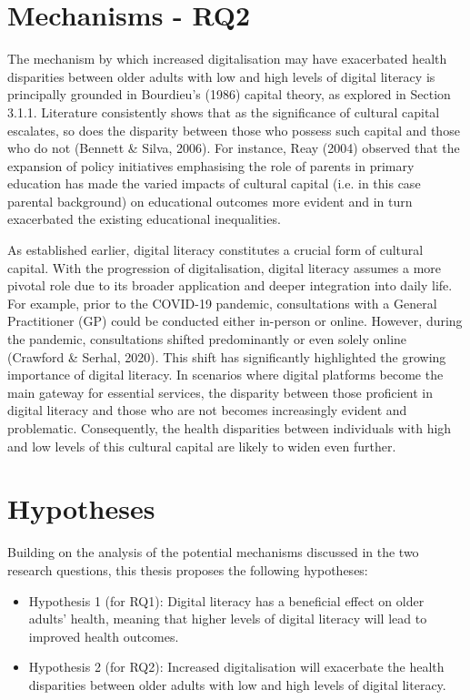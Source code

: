 \section{Mechanisms - RQ2}
The mechanism by which increased digitalisation may have exacerbated health disparities between older adults with low and high levels of digital literacy is principally grounded in Bourdieu's (1986) capital theory, as explored in Section 3.1.1. Literature consistently shows that as the significance of cultural capital escalates, so does the disparity between those who possess such capital and those who do not (Bennett \& Silva, 2006). For instance, Reay (2004) observed that the expansion of policy initiatives emphasising the role of parents in primary education has made the varied impacts of cultural capital (i.e. in this case parental background) on educational outcomes more evident and in turn exacerbated the existing educational inequalities. 

As established earlier, digital literacy constitutes a crucial form of cultural capital. With the progression of digitalisation, digital literacy assumes a more pivotal role due to its broader application and deeper integration into daily life. For example, prior to the COVID-19 pandemic, consultations with a General Practitioner (GP) could be conducted either in-person or online. However, during the pandemic, consultations shifted predominantly or even solely online (Crawford \& Serhal, 2020). This shift has significantly highlighted the growing importance of digital literacy. In scenarios where digital platforms become the main gateway for essential services, the disparity between those proficient in digital literacy and those who are not becomes increasingly evident and problematic. Consequently, the health disparities between individuals with high and low levels of this cultural capital are likely to widen even further.

\section{Hypotheses}
Building on the analysis of the potential mechanisms discussed in the two research questions, this thesis proposes the following hypotheses:

\begin{itemize}
    \item Hypothesis 1 (for RQ1): Digital literacy has a beneficial effect on older adults' health, meaning that higher levels of digital literacy will lead to improved health outcomes.
    \item Hypothesis 2 (for RQ2): Increased digitalisation will exacerbate the health disparities between older adults with low and high levels of digital literacy.
\end{itemize}